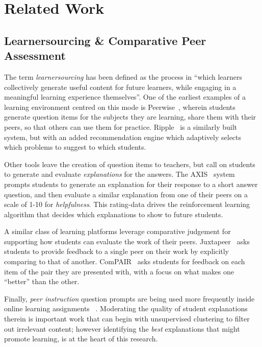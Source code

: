 \documentclass[runningheads]{llncs}
\begin{document}
\section{Related Work}


\subsection{Learnersourcing \& Comparative Peer Assessment}
The term \textit{learnersourcing} has been defined as the process in ``which 
learners collectively generate useful content for future learners, while 
engaging in a meaningful learning experience  
themselves''\cite{weir_learnersourcing_2015}.
One of the earliest examples of a learning environment centred on this mode is  
Peerwise~\cite{denny_peerwise:_2008}, wherein students generate question items 
for the subjects they are learning, share them with their peers, so that others 
can use them for practice. 
Ripple~\cite{khosravi_ripple_2019} is a similarly built system, but with an 
added recommendation engine which adaptively selects which problems to suggest 
to which students.

Other tools leave the creation of question items to teachers, but call on 
students to generate and evaluate \textit{explanations} for the answers.
The AXIS~\cite{williams_axis:_2016} system prompts students to
generate an explanation for their response to a short answer question, and then 
evaluate a similar explanation from one of their peers on a scale of 1-10 for 
\textit{helpfulness}. This rating-data drives the reinforcement learning 
algorithm that decides which explanations to show to future students.

A similar class of learning platforms leverage comparative judgement for 
supporting how students can evaluate the work of their peers. 
Juxtapeer~\cite{cambre_juxtapeer:_2018} asks students to provide feedback to a 
single peer on their work by explicitly comparing to that of another.
ComPAIR~\cite{potter_compair:_2017} asks students for feedback on each item of 
the pair they are presented with, with a focus on what makes one ``better'' 
than the other.

Finally, \textit{peer instruction} question prompts are being used more 
frequently inside online learning 
assignments~\cite{univeristy_of_british_columbia_ubc/ubcpi_2019}
\cite{charles_harnessing_2019}.
Moderating the quality of student explanations therein is important work that 
can begin with unsupervised clustering to filter out irrelevant 
content\cite{gagnon_filtering_2019}; however identifying the \textit{best} 
explanations that might promote learning, is at the heart of this research.
\end{document}
